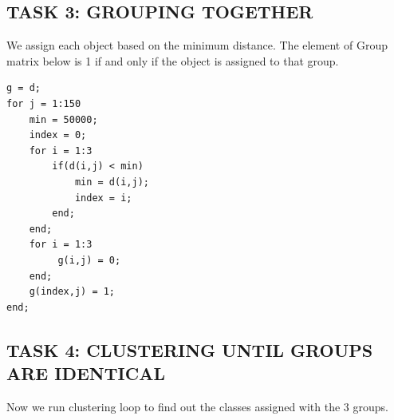 \documentclass[conference]{IEEEtran}
\begin{document}
\subsection{TASK 3: GROUPING TOGETHER}

We assign each object based on the minimum distance. The element of Group matrix below is 1 if and only if the object is assigned to that group.\\

\begin{lstlisting}g = d;
for j = 1:150
    min = 50000;
    index = 0;
    for i = 1:3
        if(d(i,j) < min)
            min = d(i,j);
            index = i;
        end;
    end;
    for i = 1:3
         g(i,j) = 0;
    end;
    g(index,j) = 1;
end;
\end{lstlisting}

\subsection{TASK 4: CLUSTERING UNTIL GROUPS ARE IDENTICAL}

Now we run clustering loop to find out the classes assigned with the 3 groups. \\
\end{document}
